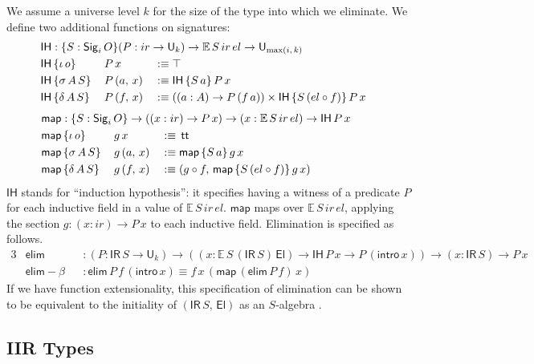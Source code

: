 \documentclass[acmsmall,screen,review]{acmart}
\newcommand{\msf}[1]{{\mathsf{#1}}}
\newcommand{\mbb}[1]{\mathbb{#1}}
\newcommand{\U}{\msf{U}}
\newcommand{\El}{\msf{El}}
\newcommand{\Sig}{\msf{Sig}}
\newcommand{\ttt}{\msf{tt}}
\newcommand{\ir}{{ir}}
\newcommand{\el}{{el}}
\newcommand{\IR}{\msf{IR}}
\newcommand{\intro}{\msf{intro}}
\newcommand{\IH}{\msf{IH}}
\newcommand{\map}{\msf{map}}
\newcommand{\elim}{\msf{elim}}
\newcommand{\E}{\mbb{E}}
\begin{document}
We assume a universe level $k$ for the size of the type into which we eliminate. We define two
additional functions on signatures:
\begin{alignat*}{3}
  &\rlap{$\IH : \{S : \Sig_i\,O\}(P : \ir \to \U_k) \to \E\,S\,\ir\,\el \to \U_{\max(i,\,k)}$} \\
  &\IH\,\{\iota\,o\}    \,&&P\,x       &&:\equiv \top \\
  &\IH\,\{\sigma\,A\,S\}\,&&P\,(a,\,x) &&:\equiv \IH\,\{S\,a\}\,P\,x\\
  &\IH\,\{\delta\,A\,S\}\,&&P\,(f,\,x) &&:\equiv ((a : A) \to P\,(f\,a)) \times \IH\,\{S\,(\el \circ f)\}\,P\,x
\end{alignat*}
\begin{alignat*}{3}
  &\hspace{-4.8em}\rlap{$\map : \{S : \Sig_i\,O\} \to ((x : \ir) \to P\,x) \to (x : \E\,S\,\ir\,\el) \to \IH\,P\,x$} \\
  &\hspace{-4.8em}\map\,\{\iota\,o\}    \,&&g\,x       &&:\equiv\,\ttt \\
  &\hspace{-4.8em}\map\,\{\sigma\,A\,S\}\,&&g\,(a,\,x) &&:\equiv \map\,\{S\,a\}\,g\,x\\
  &\hspace{-4.8em}\map\,\{\delta\,A\,S\}\,&&g\,(f,\,x) &&:\equiv (g \circ f,\,\map\,\{S\,(\el \circ f)\}\,g\,x)
\end{alignat*}
$\IH$ stands for ``induction hypothesis'': it specifies having a witness of a predicate $P$ for
each inductive field in a value of $\E\,S\,\ir\,\el$. $\map$ maps over $\E\,S\,\ir\,\el$, applying the
section $g : (x : \ir) \to P\,x$ to each inductive field. Elimination is specified as follows.
\begin{alignat*}{3}
  &\elim           &&: (P : \IR\,S \to \U_k) \to ((x : \E\,S\,(\IR\,S)\,\El) \to \IH\,P\,x \to P\,(\intro\,x)) \to (x : \IR\,S) \to P\,x \\
  &\elim\!\!-\!\!\beta &&: \elim\,P\,f\,(\intro\,x) \equiv f\,x\,(\map\,(\elim\,P\,f)\,x)
\end{alignat*}
If we have function extensionality, this specification of elimination can be shown to be equivalent
to the initiality of $(\IR\,S,\,\El)$ as an $S$-algebra \cite[Section~4.4]{DBLP:journals/apal/DybjerS03}.

\subsection{IIR Types}\label{sec:iir}
\end{document}
